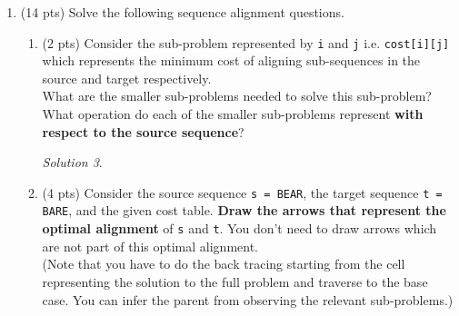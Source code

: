 \documentclass[12pt]{article}
\theoremstyle{remark}
\newtheorem*{solution}{Solution}
\begin{document}
\begin{enumerate}
\begin{enumerate}
\pagebreak
\item (3 pts) Using the bottom-up iterative algorithm presented in lecture, show the $OPT(j)$ values for all requests. Also draw the arrows to show the previous sub-problem you used to fill an entry. 
\begin{solution}

\end{solution}
\item (2 pts) Show which requests are selected in the optimal solution and the value of the solution. Provide a 2-3 sentence explanation of how you retrieved the solution using the arrows you drew.

\begin{solution}

\end{solution}
\end{enumerate}

\pagebreak
\item (14 pts) Solve the following sequence alignment questions.

\begin{enumerate}
    \item (2 pts) Consider the sub-problem represented by \texttt{i} and \texttt{j}  i.e. \texttt{cost[i][j]} which represents the minimum cost of aligning sub-sequences in the source and target respectively.\\
    What are the smaller sub-problems needed to solve this sub-problem? \\What operation do each of the smaller sub-problems represent \textbf{with respect to the source sequence}?
    \begin{solution}
    
    \end{solution}
    
    \pagebreak
    \item (4 pts) Consider the source sequence \texttt{s = BEAR}, the target sequence \texttt{t = BARE}, 
    and the given cost table. \textbf{Draw the arrows that represent the optimal alignment} of \texttt{s} and \texttt{t}. You don't need to draw arrows which are not part of this optimal alignment.
    \\(Note that you have to do the back tracing starting from the cell representing the solution to the full problem and traverse to the base case. You can infer the parent from observing the relevant sub-problems.)  
    

\end{enumerate}
\end{enumerate}
\end{document}
